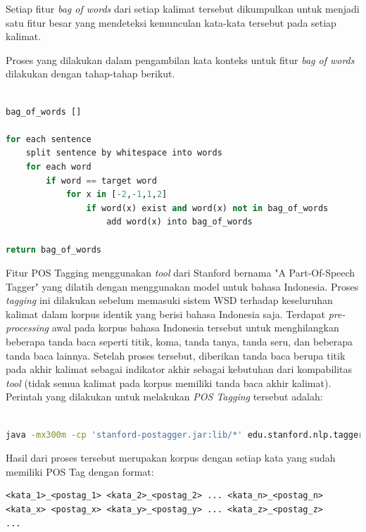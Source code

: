Setiap fitur \textit{bag of words} dari setiap kalimat tersebut dikumpulkan untuk menjadi satu fitur besar yang mendeteksi kemunculan kata-kata tersebut pada setiap kalimat.

Proses yang dilakukan dalam pengambilan kata konteks untuk fitur \textit{bag of words} dilakukan dengan tahap-tahap berikut.

\begin{lstlisting}[language=python,caption={Fitur Bag of Words}, label={fitur-bag-of-words}]

bag_of_words []

for each sentence
	split sentence by whitespace into words
	for each word
		if word == target word
			for x in [-2,-1,1,2]
				if word(x) exist and word(x) not in bag_of_words
					add word(x) into bag_of_words
					
return bag_of_words

\end{lstlisting}

Fitur POS Tagging menggunakan \textit{tool} dari Stanford bernama "A Part-Of-Speech Tagger" yang dilatih dengan menggunakan model untuk bahasa Indonesia. Proses \textit{tagging} ini dilakukan sebelum memasuki sistem WSD terhadap keseluruhan kalimat dalam korpus identik yang berisi bahasa Indonesia saja. Terdapat \textit{pre-processing} awal pada korpus bahasa Indonesia tersebut untuk menghilangkan beberapa tanda baca seperti titik, koma, tanda tanya, tanda seru, dan beberapa tanda baca lainnya. Setelah proses tersebut, diberikan tanda baca berupa titik pada akhir kalimat sebagai indikator akhir sebagai kebutuhan dari kompabilitas \textit{tool} (tidak semua kalimat pada korpus memiliki tanda baca akhir kalimat). Perintah yang dilakukan untuk melakukan \textit{POS Tagging} tersebut adalah:

\begin{lstlisting}[language=bash,caption={Stanford POS Tagger}, label={stanford-pos-tagger}]

java -mx300m -cp 'stanford-postagger.jar:lib/*' edu.stanford.nlp.tagger.maxent.MaxentTagger -model <model_bahasa_indonesia> -textFile <korpus_bahasa_indonesia>

\end{lstlisting}

Hasil dari proses tersebut merupakan korpus dengan setiap kata yang sudah memiliki POS Tag dengan format:

\begin{lstlisting}
<kata_1>_<postag_1> <kata_2>_<postag_2> ... <kata_n>_<postag_n>
<kata_x> <postag_x> <kata_y>_<postag_y> ... <kata_z>_<postag_z>
...
\end{lstlisting}

